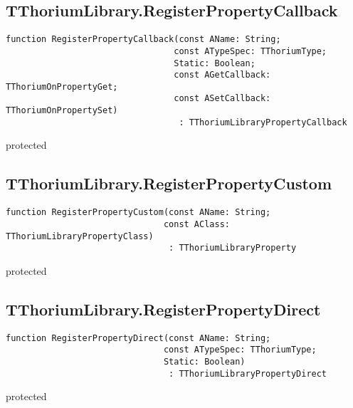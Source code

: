 \subsection{TThoriumLibrary.RegisterPropertyCallback}
\label{thoriumcorepkg:thorium:tthoriumlibrary:registerpropertycallback}
\begin{FPCList}
\Declaration 

\begin{verbatim}
function RegisterPropertyCallback(const AName: String;
                                 const ATypeSpec: TThoriumType;
                                 Static: Boolean;
                                 const AGetCallback: TThoriumOnPropertyGet;
                                 const ASetCallback: TThoriumOnPropertySet)
                                  : TThoriumLibraryPropertyCallback
\end{verbatim}
\Visibility
protected
\end{FPCList}
\subsection{TThoriumLibrary.RegisterPropertyCustom}
\label{thoriumcorepkg:thorium:tthoriumlibrary:registerpropertycustom}
\begin{FPCList}
\Declaration 

\begin{verbatim}
function RegisterPropertyCustom(const AName: String;
                               const AClass: TThoriumLibraryPropertyClass)
                                : TThoriumLibraryProperty
\end{verbatim}
\Visibility
protected
\end{FPCList}
\subsection{TThoriumLibrary.RegisterPropertyDirect}
\label{thoriumcorepkg:thorium:tthoriumlibrary:registerpropertydirect}
\begin{FPCList}
\Declaration 

\begin{verbatim}
function RegisterPropertyDirect(const AName: String;
                               const ATypeSpec: TThoriumType;
                               Static: Boolean)
                                : TThoriumLibraryPropertyDirect
\end{verbatim}
\Visibility
protected
\end{FPCList}
